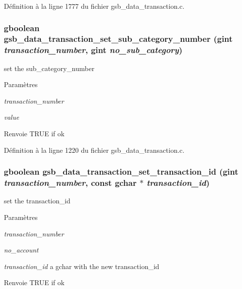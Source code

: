 Définition à la ligne 1777 du fichier gsb\_\-data\_\-transaction.c.

\subsubsection[{gsb\_\-data\_\-transaction\_\-set\_\-sub\_\-category\_\-number}]{\setlength{\rightskip}{0pt plus 5cm}gboolean gsb\_\-data\_\-transaction\_\-set\_\-sub\_\-category\_\-number (gint {\em transaction\_\-number}, \/  gint {\em no\_\-sub\_\-category})}\label{gsb__data__transaction_8h_a0a63ca7e6d34a226c6f0b8b339fbf518}
set the sub\_\-category\_\-number


\begin{DoxyParams}{Paramètres}
\item[{\em transaction\_\-number}]\item[{\em value}]\end{DoxyParams}
\begin{DoxyReturn}{Renvoie}
TRUE if ok 
\end{DoxyReturn}


Définition à la ligne 1220 du fichier gsb\_\-data\_\-transaction.c.

\subsubsection[{gsb\_\-data\_\-transaction\_\-set\_\-transaction\_\-id}]{\setlength{\rightskip}{0pt plus 5cm}gboolean gsb\_\-data\_\-transaction\_\-set\_\-transaction\_\-id (gint {\em transaction\_\-number}, \/  const gchar $\ast$ {\em transaction\_\-id})}\label{gsb__data__transaction_8h_aaafdf25dfa0a28d07716500082f6c35c}
set the transaction\_\-id 
\begin{DoxyParams}{Paramètres}
\item[{\em transaction\_\-number}]\item[{\em no\_\-account}]\item[{\em transaction\_\-id}]a gchar with the new transaction\_\-id \end{DoxyParams}
\begin{DoxyReturn}{Renvoie}
TRUE if ok 
\end{DoxyReturn}


